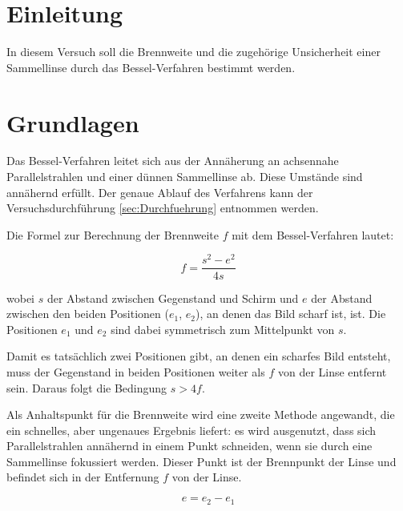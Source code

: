 \documentclass[a4paper,12pt]{article}
\begin{document}
\tableofcontents
\newpage


\section{Einleitung}

In diesem Versuch soll die Brennweite und die zugehörige Unsicherheit einer Sammellinse durch 
das Bessel-Verfahren bestimmt werden.

\section{Grundlagen}


Das Bessel-Verfahren leitet sich aus der Annäherung an achsennahe Parallelstrahlen und einer dünnen Sammellinse ab.
Diese Umstände sind annähernd erfüllt.
Der genaue Ablauf des Verfahrens kann der Versuchsdurchführung \ref{sec:Durchfuehrung} entnommen werden.

Die Formel zur Berechnung der Brennweite $f$ mit dem Bessel-Verfahren lautet:

\begin{equation}
    \label{eq:BesselBrennweite}
    f = \frac{s^2 - e^2}{4s}
\end{equation}

wobei $s$ der Abstand zwischen Gegenstand und Schirm und $e$ der Abstand zwischen den beiden
Positionen ($e_1$, $e_2$), an denen das Bild scharf ist, ist. Die Positionen $e_1$ und $e_2$
sind dabei symmetrisch zum Mittelpunkt von $s$.

Damit es tatsächlich zwei Positionen gibt, an denen ein scharfes Bild entsteht, muss der Gegenstand
in beiden Positionen weiter als $f$ von der Linse entfernt sein. Daraus folgt die Bedingung $s>4f$.

Als Anhaltspunkt für die Brennweite wird eine zweite Methode angewandt, die ein schnelles,
aber ungenaues Ergebnis liefert: es wird ausgenutzt, dass sich Parallelstrahlen annähernd in einem Punkt schneiden, wenn sie durch eine
Sammellinse fokussiert werden. Dieser Punkt ist der Brennpunkt der Linse und befindet sich in der Entfernung $f$
von der Linse.

\begin{equation}
    \label{eq:BesselAbstand}
    e = e_2 - e_1
\end{equation}
\end{document}
